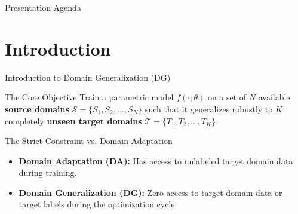 \documentclass[t, aspectratio=169]{beamer} %
\subtitle{\Large{Multiscale and Multilayer Contrastive Learning for Domain Generalization \textbf{($M^2-CL$)}}}
\author{\texorpdfstring{%
	\textbf{Group 26 members} \\[2pt]
	Vũ Thường Tín - 20230091 \\[1pt]
	Chu Anh Đức - 20230081 \\[1pt]
	Nguyễn Xuân Khải - 20235508%
}{Group 26}}
\begin{document}
	\hustintropage{}
	\hustsectionpage{}
	\husttitlepage

	\begin{frame}{Presentation Agenda}
		\tableofcontents
	\end{frame}

	\resetPageCount  
	\showPageNumber  

	\section{Introduction}
	\useStyleHustFull
	\useThinBar

	\begin{frame}{Introduction to Domain Generalization (DG)}
		\begin{block}{The Core Objective}
			Train a parametric model $f(\cdot;\theta)$ on a set of $N$ available \textbf{source domains} $\mathcal{S} = \{S_1, S_2, \dots, S_N\}$ such that it generalizes robustly to $K$ completely \textbf{unseen target domains} $\mathcal{T} = \{T_1, T_2, \dots, T_K\}$.
		\end{block}
		\begin{alertblock}{The Strict Constraint vs. Domain Adaptation}
			\begin{itemize}
				\item \textbf{Domain Adaptation (DA):} Has access to unlabeled target domain data during training.
				\item \textbf{Domain Generalization (DG):} \alert{Zero access} to target-domain data or target labels during the optimization cycle.
			\end{itemize}
		\end{alertblock}
	\end{frame}
\end{document}

